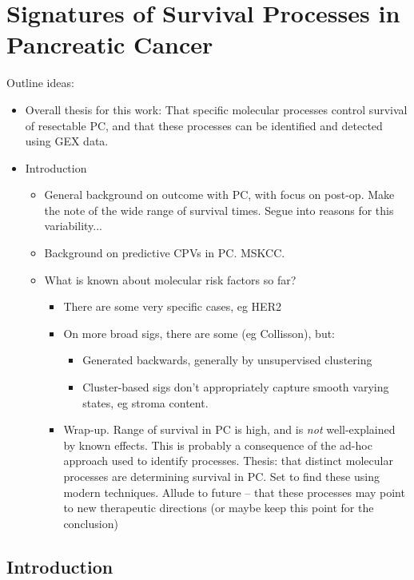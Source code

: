 \documentclass[dissertation.tex]{subfiles}
\begin{document}
\chapter{Signatures of Survival Processes in Pancreatic Cancer}
\label{chap:signatures}

Outline ideas:
\begin{itemize}
  \item Overall thesis for this work: That specific molecular processes control survival of resectable PC, and that these processes can be identified and detected using GEX data.
  \item Introduction
  \begin{itemize}
    \item General background on outcome with PC, with focus on post-op.  Make the note of the wide range of survival times.  Segue into reasons for this variability...
    \item Background on predictive CPVs in PC.  MSKCC.
    \item What is known about molecular risk factors so far?
    \begin{itemize}
      \item There are some very specific cases, eg HER2
      \item On more broad sigs, there are some (eg Collisson), but:
      \begin{itemize}
        \item Generated backwards, generally by unsupervised clustering
        \item Cluster-based sigs don't appropriately capture smooth varying states, eg stroma content.
      \end{itemize}
    \item Wrap-up.  Range of survival in PC is high, and is \emph{not} well-explained by known effects.  This is probably a consequence of the ad-hoc approach used to identify processes.  Thesis: that distinct molecular processes are determining survival in PC.  Set to find these using modern techniques.  Allude to future -- that these processes may point to new therapeutic directions (or maybe keep this point for the conclusion)
    \end{itemize}
  \end{itemize}
\end{itemize}

\section{Introduction}
\end{document}
